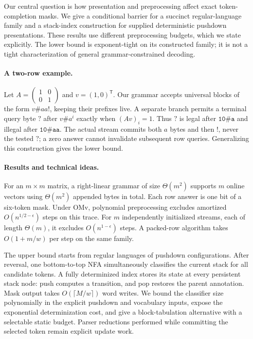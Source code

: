 \documentclass[manuscript,screen,11pt,nonacm]{acmart}
\theoremstyle{definition}\newtheorem{definition}{Definition}
\begin{document}
Our central question is how presentation and preprocessing affect exact token-completion masks. We give a conditional barrier for a succinct regular-language family and a stack-index construction for supplied deterministic pushdown presentations. These results use different preprocessing budgets, which we state explicitly. The lower bound is exponent-tight on its constructed family; it is not a tight characterization of general grammar-constrained decoding.

\paragraph{A two-row example.}
Let $A=\left(\begin{smallmatrix}1&0\\0&1\end{smallmatrix}\right)$ and $v=(1,0)^\mathsf T$. Our grammar accepts universal blocks of the form $v\#aa!$, keeping their prefixes live. A separate branch permits a terminal query byte $?$ after $v\#a^i$ exactly when $(Av)_i=1$. Thus $?$ is legal after $\mathtt{10\#a}$ and illegal after $\mathtt{10\#aa}$. The actual stream commits both $a$ bytes and then $!$, never the tested $?$; a zero answer cannot invalidate subsequent row queries. Generalizing this construction gives the lower bound.

\paragraph{Results and technical ideas.}
For an $m\times m$ matrix, a right-linear grammar of size $\Theta(m^2)$ supports $m$ online vectors using $\Theta(m^2)$ appended bytes in total. Each row answer is one bit of a six-token mask. Under OMv, polynomial preprocessing excludes amortized $O(n^{1/2-\epsilon})$ steps on this trace. For $m$ independently initialized streams, each of length $\Theta(m)$, it excludes $O(n^{1-\epsilon})$ steps. A packed-row algorithm takes $O(1+m/w)$ per step on the same family.

The upper bound starts from regular languages of pushdown configurations. After reversal, one bottom-to-top NFA simultaneously classifies the current stack for all candidate tokens. A fully determinized index stores its state at every persistent stack node: push computes a transition, and pop restores the parent annotation. Mask output takes $O(\lceil M/w\rceil)$ word writes. We bound the classifier size polynomially in the explicit pushdown and vocabulary inputs, expose the exponential determinization cost, and give a block-tabulation alternative with a selectable static budget. Parser reductions performed while committing the selected token remain explicit update work.
\end{document}

